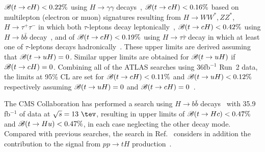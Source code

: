 $\mathscr{B}(t\to cH)<0.22\%$ using $H\to \gamma\gamma$ decays~\cite{Aaboud:2017mfd}, $\mathscr{B}(t\to cH)<0.16\%$ based on
multilepton (electron or muon) signatures resulting from 
$H \to  WW^*, ZZ^*$, $H\to \tau^+\tau^-$ in which both $\tau$-leptons decay leptonically~\cite{Aaboud:2018pob},
$\mathscr{B}(t\to cH)<0.42\%$ using $H\to b\bar{b}$ decay~\cite{fcnc36}, and of $\mathscr{B}(t\to cH)<0.19\%$ using $H\to \tau\bar{\tau}$ decay in which at least
one of $\tau$-leptons decays hadronically~\cite{fcnc36}.  
These upper limits are derived assuming that $\mathscr{B}(t\to uH)=0$. Similar upper limits are obtained for $\mathscr{B}(t\to uH)$ if $\mathscr{B}(t\to cH)=0$.
Combining all of the ATLAS searches using 36fb$^{-1}$ Run~2 data, the limits at 95\% CL are set for  $\mathscr{B}(t\to cH)<0.11\%$ and $\mathscr{B}(t\to uH)<0.12\%$ respectively assuming $\mathscr{B}(t\to uH)=0$ and $\mathscr{B}(t\to cH)=0$~\cite{fcnc36}.

The CMS Collaboration has performed a search using  
$H\to b\bar{b}$ decays~\cite{Sirunyan:2017uae} with 35.9 fb$^{-1}$ of data at $\sqrt{s}=13~\tev$, resulting 
in upper limits of $\mathscr{B}(t\to Hc)<0.47\%$ and $\mathscr{B}(t\to Hu)<0.47\%$, in each case neglecting the other decay mode.
Compared with previous searches, the search in Ref.~\cite{Sirunyan:2017uae} considers in addition the contribution to the signal from 
$pp \to tH$ production~\cite{Greljo:2014dka}.


